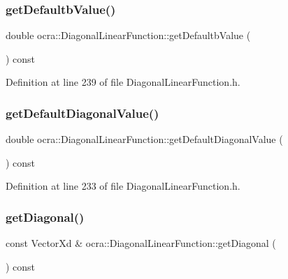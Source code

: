 \subsubsection{\texorpdfstring{get\+Defaultb\+Value()}{getDefaultbValue()}}
{\footnotesize\ttfamily double ocra\+::\+Diagonal\+Linear\+Function\+::get\+Defaultb\+Value (\begin{DoxyParamCaption}{ }\end{DoxyParamCaption}) const\hspace{0.3cm}{\ttfamily [inline]}}



Definition at line 239 of file Diagonal\+Linear\+Function.\+h.

\hypertarget{classocra_1_1DiagonalLinearFunction_a01a923080ce21e1328503c29b1b57c6e}{}\label{classocra_1_1DiagonalLinearFunction_a01a923080ce21e1328503c29b1b57c6e} 
\subsubsection{\texorpdfstring{get\+Default\+Diagonal\+Value()}{getDefaultDiagonalValue()}}
{\footnotesize\ttfamily double ocra\+::\+Diagonal\+Linear\+Function\+::get\+Default\+Diagonal\+Value (\begin{DoxyParamCaption}{ }\end{DoxyParamCaption}) const\hspace{0.3cm}{\ttfamily [inline]}}



Definition at line 233 of file Diagonal\+Linear\+Function.\+h.

\hypertarget{classocra_1_1DiagonalLinearFunction_a1b2acc7225716b75ef0cf9995a49406b}{}\label{classocra_1_1DiagonalLinearFunction_a1b2acc7225716b75ef0cf9995a49406b} 
\subsubsection{\texorpdfstring{get\+Diagonal()}{getDiagonal()}}
{\footnotesize\ttfamily const Vector\+Xd \& ocra\+::\+Diagonal\+Linear\+Function\+::get\+Diagonal (\begin{DoxyParamCaption}{ }\end{DoxyParamCaption}) const\hspace{0.3cm}{\ttfamily [inline]}}

